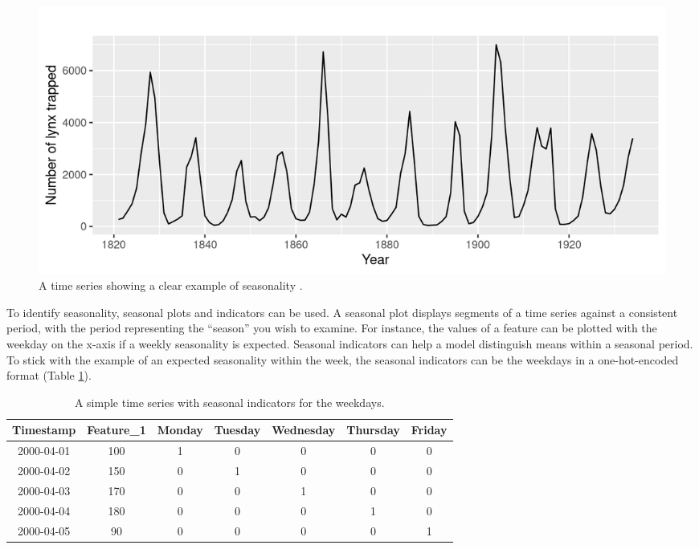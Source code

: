 \begin{figure}[h]
    \centering
    \includegraphics[width=0.75\linewidth]{img/Seasonality Time Series.png}
    \caption{A time series showing a clear example of seasonality \parencite{hyndman2011cyclic}.}
    \label{fig:ts_seasonality}
\end{figure}

To identify seasonality, seasonal plots and indicators can be used. A seasonal plot displays segments of a time series against a consistent period, with the period representing the ``season'' you wish to examine. For instance, the values of a feature can be plotted with the weekday on the x-axis if a weekly seasonality is expected. Seasonal indicators can help a model distinguish means within a seasonal period. To stick with the example of an expected seasonality within the week, the seasonal indicators can be the weekdays in a one-hot-encoded format (Table \ref{tab:time_series_simple}).

\begin{table}[h]
    \centering
    \begin{tabular}{|c|c|c|c|c|c|c|}
        \hline
        \textbf{Timestamp} & \textbf{Feature\_1} & \textbf{Monday} & \textbf{Tuesday} & \textbf{Wednesday} & \textbf{Thursday} & \textbf{Friday} \\
        \hline
        2000-04-01         & 100                 & 1               & 0                & 0                  & 0                 & 0               \\
        \hline
        2000-04-02         & 150                 & 0               & 1                & 0                  & 0                 & 0               \\
        \hline
        2000-04-03         & 170                 & 0               & 0                & 1                  & 0                 & 0               \\
        \hline
        2000-04-04         & 180                 & 0               & 0                & 0                  & 1                 & 0               \\
        \hline
        2000-04-05         & 90                  & 0               & 0                & 0                  & 0                 & 1               \\
        \hline
    \end{tabular}
    \caption{A simple time series with seasonal indicators for the weekdays.}
    \label{tab:time_series_simple}
\end{table}


